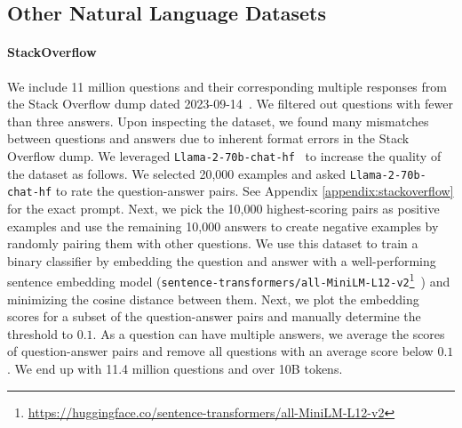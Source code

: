 \documentclass[10pt]{article} %
\begin{document}

\subsection{Other Natural Language Datasets}\label{sec:source_nl_datasets}

\paragraph{StackOverflow} 
We include 11 million questions and their corresponding multiple responses from the Stack Overflow dump dated 2023-09-14~\citep{stackoverflow_archive}. We filtered out questions with fewer than three answers. Upon inspecting the dataset, we found many mismatches between questions and answers due to inherent format errors in the Stack Overflow dump. We leveraged \verb|Llama-2-70b-chat-hf|~\citep{touvron2023llama} to increase the quality of the dataset as follows. We selected 20,000 examples and asked \verb|Llama-2-70b-chat-hf| to rate the question-answer pairs. See Appendix \ref{appendix:stackoverflow} for the exact prompt. Next, we pick the 10,000 highest-scoring pairs as positive examples and use the remaining 10,000 answers to create negative examples by randomly pairing them with other questions. We use this dataset to train a binary classifier by embedding the question and answer with a well-performing sentence embedding model (\verb|sentence-transformers/all-MiniLM-L12-v2|\footnote{\url{https://huggingface.co/sentence-transformers/all-MiniLM-L12-v2}}~\citep{reimers2019sentence,muennighoff2022mteb}) and minimizing the cosine distance between them. Next, we plot the embedding scores for a subset of the question-answer pairs and manually determine the threshold to $0.1$. As a question can have multiple answers, we average the scores of question-answer pairs and remove all questions with an average score below $0.1$. We end up with 11.4 million questions and over 10B tokens. 


\end{document}
